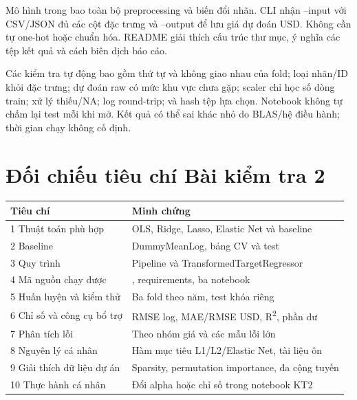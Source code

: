 \documentclass[12pt,a4paper]{article}
\begin{document}
Mô hình trong  bao toàn bộ preprocessing và biến đổi nhãn. CLI nhận --input với CSV/JSON đủ các cột đặc trưng và --output để lưu giá dự đoán USD. Không cần tự one-hot hoặc chuẩn hóa. README giải thích cấu trúc thư mục, ý nghĩa các tệp kết quả và cách biên dịch báo cáo.


Các kiểm tra tự động bao gồm thứ tự và không giao nhau của fold; loại nhãn/ID khỏi đặc trưng; dự đoán raw có mức khu vực chưa gặp; scaler chỉ học số dòng train; xử lý thiếu/NA; log round-trip; và hash tệp lựa chọn. Notebook không tự chấm lại test mỗi khi mở. Kết quả có thể sai khác nhỏ do BLAS/hệ điều hành; thời gian chạy không cố định.


\clearpage\section{Đối chiếu tiêu chí Bài kiểm tra 2}

\begingroup\small\begin{tabularx}{\linewidth}{YY}\toprule\textbf{Tiêu chí}&\textbf{Minh chứng}\\\midrule

1 Thuật toán phù hợp & OLS, Ridge, Lasso, Elastic Net và baseline\\

2 Baseline & DummyMeanLog, bảng CV và test\\

3 Quy trình & Pipeline và TransformedTargetRegressor\\

4 Mã nguồn chạy được & , requirements, ba notebook\\

5 Huấn luyện và kiểm thử & Ba fold theo năm, test khóa riêng\\

6 Chỉ số và công cụ bổ trợ & RMSE log, MAE/RMSE USD, R\textsuperscript{2}, phần dư\\

7 Phân tích lỗi & Theo nhóm giá và các mẫu lỗi lớn\\

8 Nguyên lý cá nhân & Hàm mục tiêu L1/L2/Elastic Net, tài liệu ôn\\

9 Giải thích dữ liệu dự án & Sparsity, permutation importance, đa cộng tuyến\\

10 Thực hành cá nhân & Đổi alpha hoặc chỉ số trong notebook KT2\\

\bottomrule\end{tabularx}\endgroup
\end{document}
